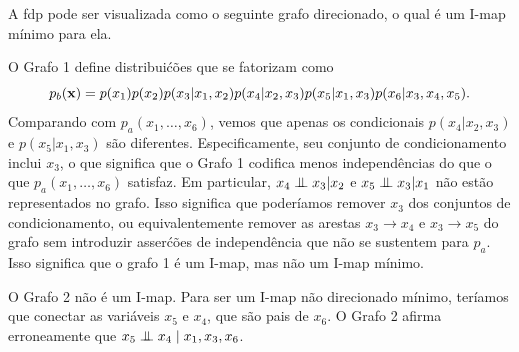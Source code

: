 \begin{solution}
A fdp pode ser visualizada como o seguinte grafo direcionado, o qual \'e um I-map m\'inimo para ela.\\
\begin{center}
\end{center}
O Grafo 1 define distribui\'c\~oes que se fatorizam como
\begin{equation}
    p_b(\mathbf{x}) = p(x_1) p(x_2) p(x_3|x_1, x_2) p(x_4|x_2, x_3) p(x_5|x_1, x_3) p(x_6|x_3,x_4,x_5).
\end{equation}
Comparando com $p_a(x_1, \ldots, x_6)$, vemos que apenas os condicionais $p(x_4|x_2, x_3)$ e $p(x_5|x_1, x_3)$ s\~ao diferentes. Especificamente, seu conjunto de condicionamento inclui $x_3$, o que significa que o Grafo 1 codifica menos independ\^encias do que o que $p_a(x_1, \ldots, x_6)$ satisfaz. Em particular, $x_4 \mathrel{\perp\mspace{-10mu}\perp} x_3 | x_2$ e $x_5 \mathrel{\perp\mspace{-10mu}\perp} x_3 | x_1$ n\~ao est\~ao representados no grafo. Isso significa que poder\'iamos remover $x_3$ dos conjuntos de condicionamento, ou equivalentemente remover as arestas $x_3 \rightarrow x_4$ e $x_3 \rightarrow x_5$ do grafo sem introduzir asser\'c\~oes de independ\^encia que n\~ao se sustentem para $p_a$. Isso significa que o grafo 1 \'e um I-map, mas n\~ao um I-map m\'inimo.

O Grafo 2 n\~ao \'e um I-map. Para ser um I-map n\~ao direcionado m\'inimo, ter\'iamos que conectar as vari\'aveis $x_5$ e $x_4$, que s\~ao pais de $x_6$. O Grafo 2 afirma erroneamente que $x_5 \mathrel{\perp\mspace{-10mu}\perp} x_4 \mid x_1,x_3,x_6$.

\end{solution}



